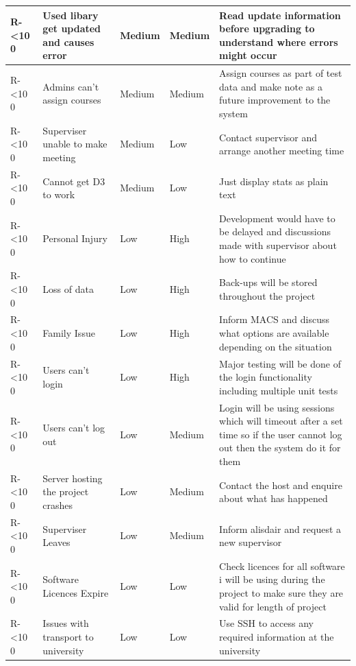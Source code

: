 \documentclass[12pt]{article}  %
\newcommand{\rid}[1]{\centering #1-\ifnum\value{requirement}<10 0\fi\arabic{requirement} \stepcounter{requirement}}
\begin{document}
\begin{spacing}{1.5}
\begin{longtable}{|p{}|p{}|p{}|p{}|p{}|}
\rid{R} & Used libary get updated and causes error & Medium & Medium & Read update information before upgrading to understand where errors might occur\\ \hline

\rid{R} & Admins can’t assign courses & Medium & Medium & Assign courses as part of test data and make note as a future improvement to the system  \\ \hline

\rid{R} & Superviser unable to make meeting & Medium & Low & Contact supervisor and arrange another meeting time \\ \hline

\rid{R} & Cannot get D3 to work & Medium & Low & Just display stats as plain text\\ \hline



\rid{R} & Personal Injury & Low & High & Development would have to be delayed and discussions made with supervisor about how to continue\\ \hline

\rid{R} & Loss of data & Low & High & Back-ups will be stored throughout the project\\
\hline

\rid{R} & Family Issue & Low & High  & Inform MACS and discuss what options are available depending on the situation \\ \hline

\rid{R} & Users can't login & Low & High & Major testing will be done of the login functionality including multiple unit tests\\ \hline

\rid{R} & Users can't log out & Low & Medium & Login will be using sessions which will timeout after a set time so if the user cannot log out then the system do it for them\\ \hline

\rid{R} & Server hosting the project crashes & Low & Medium & Contact the host and enquire about what has happened\\ \hline

\rid{R} & Superviser Leaves & Low & Medium & Inform alisdair and request a new supervisor\\ \hline

\rid{R} & Software Licences Expire & Low & Low & Check licences for all software i will be using during the project to make sure they are valid for length of project\\ \hline

\rid{R} & Issues with transport to university  & Low & Low & Use SSH to access any required information at the university  \\ \hline

\end{longtable}
\end{spacing}
\end{document}

